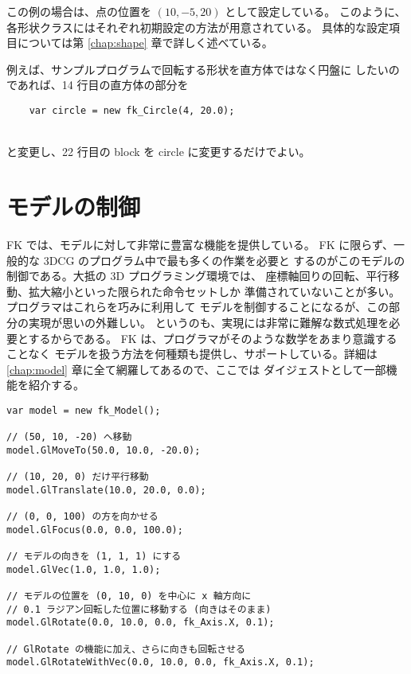 この例の場合は、点の位置を \((10, -5, 20)\) として設定している。
このように、各形状クラスにはそれぞれ初期設定の方法が用意されている。
具体的な設定項目については第 \ref{chap:shape} 章で詳しく述べている。

例えば、サンプルプログラムで回転する形状を直方体ではなく円盤に
したいのであれば、14 行目の直方体の部分を
\\
\begin{screen}
\begin{verbatim}
    var circle = new fk_Circle(4, 20.0);
\end{verbatim}
\end{screen}
~ \\
と変更し、22 行目の block を circle に変更するだけでよい。

\section{モデルの制御}
FK では、モデルに対して非常に豊富な機能を提供している。
FK に限らず、一般的な 3DCG のプログラム中で最も多くの作業を必要と
するのがこのモデルの制御である。大抵の 3D プログラミング環境では、
座標軸回りの回転、平行移動、拡大縮小といった限られた命令セットしか
準備されていないことが多い。プログラマはこれらを巧みに利用して
モデルを制御することになるが、この部分の実現が思いの外難しい。
というのも、実現には非常に難解な数式処理を必要とするからである。
FK は、プログラマがそのような数学をあまり意識することなく
モデルを扱う方法を何種類も提供し、サポートしている。詳細は
\ref{chap:model} 章に全て網羅してあるので、ここでは
ダイジェストとして一部機能を紹介する。
\\
\begin{screen}
\begin{verbatim}
var model = new fk_Model();

// (50, 10, -20) へ移動
model.GlMoveTo(50.0, 10.0, -20.0);

// (10, 20, 0) だけ平行移動
model.GlTranslate(10.0, 20.0, 0.0);

// (0, 0, 100) の方を向かせる
model.GlFocus(0.0, 0.0, 100.0);

// モデルの向きを (1, 1, 1) にする
model.GlVec(1.0, 1.0, 1.0);

// モデルの位置を (0, 10, 0) を中心に x 軸方向に
// 0.1 ラジアン回転した位置に移動する (向きはそのまま)
model.GlRotate(0.0, 10.0, 0.0, fk_Axis.X, 0.1);

// GlRotate の機能に加え、さらに向きも回転させる
model.GlRotateWithVec(0.0, 10.0, 0.0, fk_Axis.X, 0.1);
\end{verbatim}
\end{screen}
\\

